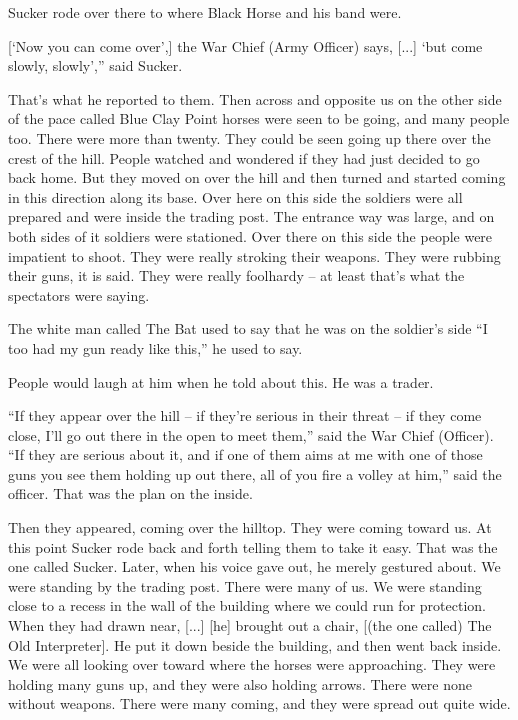 Sucker rode over there to where Black Horse and his band were.

[`Now you can come over',] the War Chief (Army Officer) says, [...] `but come slowly, slowly','' said Sucker. 

That's what he reported to them. Then across and opposite us on the other side of the pace called Blue Clay Point horses were seen to be going, and many people too. There were more than twenty. They could be seen going up there over the crest of the hill. People watched and wondered if they had just decided to go back home. But they moved on over the hill and then turned and started coming in this direction along its base. Over here on this side the soldiers were all prepared and were inside the trading post. The entrance way was large, and on both sides of it soldiers were stationed. Over there on this side the people were impatient to shoot. They were really stroking their weapons. They were rubbing their guns, it is said. They were really foolhardy -- at least that's what the spectators were saying.

The white man called The Bat used to say that he was on the soldier's side ``I too had my gun ready like this,'' he used to say.

People would laugh at him when he told about this. He was a trader.

``If they appear over the hill -- if they're serious in their threat -- if they come close, I'll go out there in the open to meet them,'' said the War Chief (Officer). ``If they are serious about it, and if one of them aims at me with one of those guns you see them holding up out there, all of you fire a volley at him,'' said the officer. That was the plan on the inside.

Then they appeared, coming over the hilltop. They were coming toward us. At this point Sucker rode back and forth telling them to take it easy. That was the one called Sucker. Later, when his voice gave out, he merely gestured about. We were standing by the trading post. There were many of us. We were standing close to a recess in the wall of the building where we could run for protection. When they had drawn near, [...] [he] brought out a chair, [(the one called) The Old Interpreter]. He put it down beside the building, and then went back inside. We were all looking over toward where the horses were approaching. They were holding many guns up, and they were also holding arrows. There were none without weapons. There were many coming, and they were spread out quite wide.

